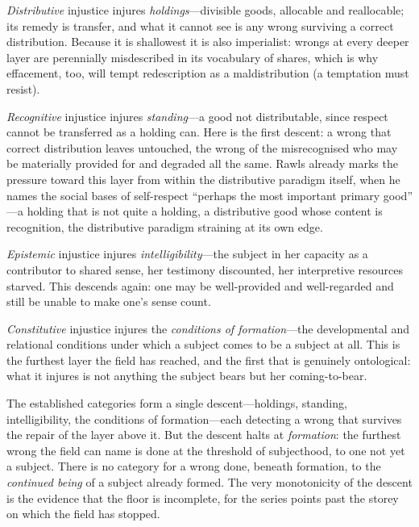 \emph{Distributive} injustice injures \emph{holdings}---divisible goods, allocable and reallocable; its remedy is transfer, and what it cannot see is any wrong surviving a correct distribution. Because it is shallowest it is also imperialist: wrongs at every deeper layer are perennially misdescribed in its vocabulary of shares, which is why effacement, too, will tempt redescription as a maldistribution (a temptation  must resist).

\emph{Recognitive} injustice injures \emph{standing}---a good not distributable, since respect cannot be transferred as a holding can. Here is the first descent: a wrong that correct distribution leaves untouched, the wrong of the misrecognised who may be materially provided for and degraded all the same. Rawls already marks the pressure toward this layer from within the distributive paradigm itself, when he names the social bases of self-respect ``perhaps the most important primary good'' \parencite{rawls1971}---a holding that is not quite a holding, a distributive good whose content is recognition, the distributive paradigm straining at its own edge.

\emph{Epistemic} injustice injures \emph{intelligibility}---the subject in her capacity as a contributor to shared sense, her testimony discounted, her interpretive resources starved. This descends again: one may be well-provided and well-regarded and still be unable to make one's sense count.

\emph{Constitutive} injustice injures the \emph{conditions of formation}---the developmental and relational conditions under which a subject comes to be a subject at all. This is the furthest layer the field has reached, and the first that is genuinely ontological: what it injures is not anything the subject bears but her coming-to-bear.

\begin{claim}
The established categories form a single descent---holdings, standing, intelligibility, the conditions of formation---each detecting a wrong that survives the repair of the layer above it. But the descent halts at \emph{formation}: the furthest wrong the field can name is done at the threshold of subjecthood, to one not yet a subject. There is no category for a wrong done, beneath formation, to the \emph{continued being} of a subject already formed. The very monotonicity of the descent is the evidence that the floor is incomplete, for the series points past the storey on which the field has stopped.
\end{claim}

